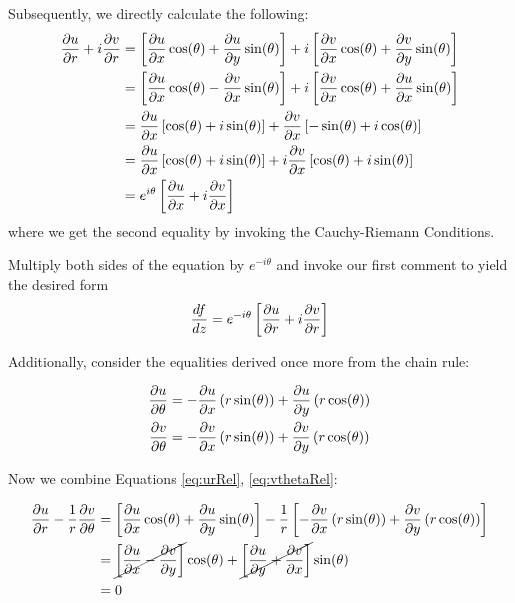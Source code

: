 \documentclass[12pt]{article}%
\begin{document}
Subsequently, we directly calculate the following:
\begin{align*}
  \frac{\partial{u}}{\partial{r}} + i\frac{\partial{v}}{\partial{r}} & = \left[\frac{\partial{u}}{\partial{x}} \cos(\theta) + \frac{\partial{u}}{\partial{y}}\sin(\theta)\right] + i\left[\frac{\partial{v}}{\partial{x}} \cos(\theta) + \frac{\partial{v}}{\partial{y}}\sin(\theta)\right] \\
  & = \left[\frac{\partial{u}}{\partial{x}} \cos(\theta) - \frac{\partial{v}}{\partial{x}}\sin(\theta)\right] + i\left[\frac{\partial{v}}{\partial{x}} \cos(\theta) + \frac{\partial{u}}{\partial{x}}\sin(\theta)\right] \\
  & = \frac{\partial{u}}{\partial{x}}\left[\cos(\theta) + i\sin(\theta)\right] + \frac{\partial{v}}{\partial{x}}\left[-\sin(\theta) + i\cos(\theta)\right] \\
  & = \frac{\partial{u}}{\partial{x}}\left[\cos(\theta) + i\sin(\theta)\right] + i \frac{\partial{v}}{\partial{x}}\left[\cos(\theta) + i\sin(\theta)\right] \\
  & = e^{i\theta}\left[\frac{\partial{u}}{\partial{x}} + i\frac{\partial{v}}{\partial{x}}\right]
\end{align*}
where we get the second equality by invoking the Cauchy-Riemann Conditions.

Multiply both sides of the equation by $e^{-i\theta}$ and invoke our first comment to yield the desired form \[\frac{d{f}}{d{z}}= e^{-i\theta} \left[\frac{\partial{u}}{\partial{r}} + i\frac{\partial{v}}{\partial{r}} \right]\]

Additionally, consider the equalities derived once more from the chain rule:

\begin{align}
  \frac{\partial{u}}{\partial{\theta}} & = - \frac{\partial{u}}{\partial{x}}\left(r \sin(\theta)\right) + \frac{\partial{u}}{\partial{y}}\left(r\cos(\theta)\right) \label{eq:uthetaRel} \\
    \frac{\partial{v}}{\partial{\theta}} & = - \frac{\partial{v}}{\partial{x}}\left(r \sin(\theta)\right) + \frac{\partial{v}}{\partial{y}}\left(r\cos(\theta)\right) \label{eq:vthetaRel}
\end{align}

Now we combine Equations \ref{eq:urRel}, \ref{eq:vthetaRel}:

\begin{align*}
  \frac{\partial{u}}{\partial{r}} - \frac{1}{r}\frac{\partial{v}}{\partial{\theta}} & = \left[\frac{\partial{u}}{\partial{x}} \cos(\theta) + \frac{\partial{u}}{\partial{y}}\sin(\theta)\right] - \frac{1}{r}\left[- \frac{\partial{v}}{\partial{x}}\left(r \sin(\theta)\right) + \frac{\partial{v}}{\partial{y}}\left(r\cos(\theta)\right) \right] \\
  & = \cancel{\left[\frac{\partial{u}}{\partial{x}} - \frac{\partial{v}}{\partial{y}}\right]} \cos(\theta) + \cancel{\left[\frac{\partial{u}}{\partial{y}} +  \frac{\partial{v}}{\partial{x}}\right]} \sin(\theta) \\
  & = 0
\end{align*}
\end{document}
